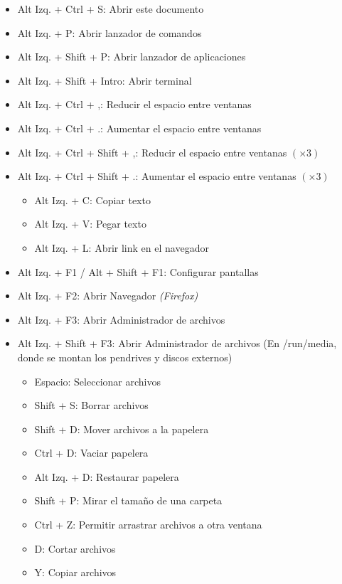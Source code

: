 \documentclass[12pt]{article}
\begin{document}
\begin{itemize}
\setlength\itemsep{-0.4em}
\item Alt Izq. + Ctrl + S: Abrir este documento
\item Alt Izq. + P: Abrir lanzador de comandos
\item Alt Izq. + Shift + P: Abrir lanzador de aplicaciones
\item Alt Izq. + Shift + Intro: Abrir terminal
\item Alt Izq. + Ctrl + ,: Reducir el espacio entre ventanas
\item Alt Izq. + Ctrl + .: Aumentar el espacio entre ventanas
\item Alt Izq. + Ctrl + Shift + ,: Reducir el espacio entre ventanas $(\times 3)$
\item Alt Izq. + Ctrl + Shift + .: Aumentar el espacio entre ventanas $(\times 3)$
\vspace{-5pt}
\begin{itemize}
\setlength\itemsep{-0.3em}
\item Alt Izq. + C: Copiar texto
\item Alt Izq. + V: Pegar texto
\item Alt Izq. + L: Abrir link en el navegador
\end{itemize}
\item Alt Izq. + F1 / Alt + Shift + F1: Configurar pantallas
\item Alt Izq. + F2: Abrir Navegador \emph{(Firefox)}
\item Alt Izq. + F3: Abrir Administrador de archivos
\item Alt Izq. + Shift + F3: Abrir Administrador de archivos (En /run/media, donde se montan los pendrives y discos externos)
\vspace{-5pt}
\begin{itemize}
\setlength\itemsep{-0.3em}
\item Espacio: Seleccionar archivos
\item Shift + S: Borrar archivos
\item Shift + D: Mover archivos a la papelera
\item Ctrl + D: Vaciar papelera
\item Alt Izq. + D: Restaurar papelera
\item Shift + P: Mirar el tamaño de una carpeta
\item Ctrl + Z: Permitir arrastrar archivos a otra ventana
\item D: Cortar archivos
\item Y: Copiar archivos

\end{itemize}
\end{itemize}
\end{document}
